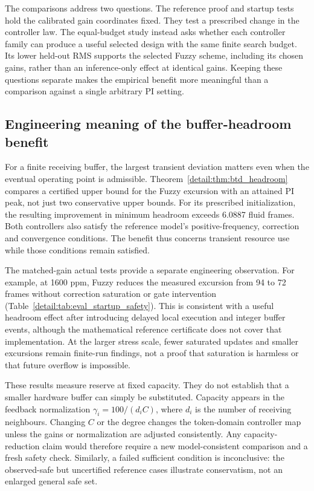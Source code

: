 The comparisons address two questions. The reference proof and
startup tests hold the calibrated gain coordinates fixed. They test
a prescribed change in the controller law. The
equal-budget study instead asks whether each controller family can
produce a useful selected design with the same finite search budget.
Its lower held-out RMS supports the selected Fuzzy scheme, including
its chosen gains, rather than an inference-only effect at identical
gains. Keeping these questions separate makes the empirical benefit
more meaningful than a comparison against a single arbitrary PI setting.

\subsection{Engineering meaning of the buffer-headroom benefit}
\label{detail:subsec:discussion_headroom}

For a finite receiving buffer, the largest transient deviation matters
even when the eventual operating point is admissible.
Theorem~\ref{detail:thm:btd_headroom} compares a certified upper bound for the
Fuzzy excursion with an attained PI peak, not just two conservative
upper bounds. For its prescribed initialization, the resulting
improvement in minimum headroom exceeds 6.0887 fluid frames. Both
controllers also satisfy the reference model's positive-frequency,
correction and convergence conditions. The benefit thus concerns
transient resource use while those conditions remain satisfied.

The matched-gain actual tests provide a separate engineering observation.
For example, at 1600 ppm, Fuzzy reduces the measured excursion from
94 to 72 frames without correction saturation or gate intervention
(Table~\ref{detail:tab:eval_startup_safety}). This is consistent with a useful
headroom effect after introducing delayed local execution and integer
buffer events, although the mathematical reference certificate does
not cover that implementation. At the larger stress scale, fewer
saturated updates and smaller excursions remain finite-run findings,
not a proof that saturation is harmless or that future overflow is
impossible.

These results measure reserve at fixed capacity. They do not establish
that a smaller hardware buffer can simply be substituted. Capacity
appears in the feedback normalization
$\gamma_i=100/(d_iC)$, where $d_i$ is the number of receiving neighbours.
Changing $C$ or the degree changes the token-domain controller map
unless the gains or normalization are adjusted consistently. Any
capacity-reduction claim would therefore require a new model-consistent
comparison and a fresh safety check. Similarly, a failed sufficient
condition is inconclusive: the observed-safe but uncertified reference cases
illustrate conservatism, not an enlarged general safe set.

